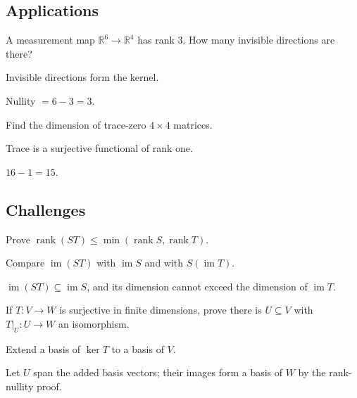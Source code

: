 \subsection*{Applications}

\begin{exercise}\label{exr:i06-expand-13}
A measurement map \(\mathbb R^6\to\mathbb R^4\) has rank \(3\). How many invisible directions are there?
\end{exercise}
\begin{hint}
Invisible directions form the kernel.
\end{hint}
\begin{solution}
Nullity \(=6-3=3\).
\end{solution}

\begin{exercise}\label{exr:i06-expand-14}
Find the dimension of trace-zero \(4\times4\) matrices.
\end{exercise}
\begin{hint}
Trace is a surjective functional of rank one.
\end{hint}
\begin{solution}
\(16-1=15\).
\end{solution}

\subsection*{Challenges}

\begin{exercise}\label{exr:i06-expand-15}
Prove \(\operatorname{rank}(ST)\le\min(\operatorname{rank}S,\operatorname{rank}T)\).
\end{exercise}
\begin{hint}
Compare \(\operatorname{im}(ST)\) with \(\operatorname{im}S\) and with \(S(\operatorname{im}T)\).
\end{hint}
\begin{solution}
\(\operatorname{im}(ST)\subseteq\operatorname{im}S\), and its dimension cannot exceed the dimension of \(\operatorname{im}T\).
\end{solution}

\begin{exercise}\label{exr:i06-expand-16}
If \(T:V\to W\) is surjective in finite dimensions, prove there is \(U\subseteq V\) with \(T|_U:U\to W\) an isomorphism.
\end{exercise}
\begin{hint}
Extend a basis of \(\ker T\) to a basis of \(V\).
\end{hint}
\begin{solution}
Let \(U\) span the added basis vectors; their images form a basis of \(W\) by the rank-nullity proof.
\end{solution}
